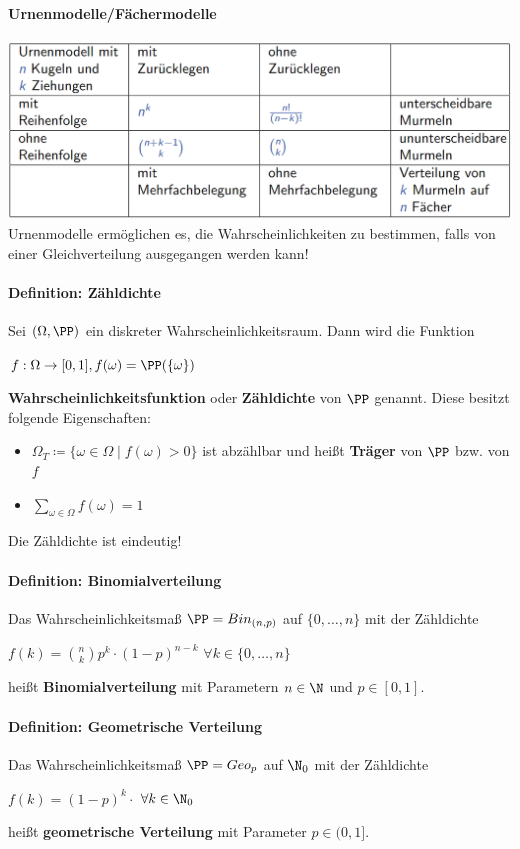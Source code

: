 \paragraph{Urnenmodelle/Fächermodelle}
\includegraphics[width=\textwidth]{images/image1.png}
Urnenmodelle ermöglichen es, die Wahrscheinlichkeiten zu bestimmen, falls von einer Gleichverteilung ausgegangen
werden kann!

\paragraph{Definition: Zähldichte}
Sei $(\Omega,\PP)$ ein diskreter Wahrscheinlichkeitsraum.
Dann wird die Funktion\\
\begin{tightcenter}
	$f:\Omega\rightarrow[0,1], f(\omega)=\PP(\{\omega\})$
\end{tightcenter}
\textbf{Wahrscheinlichkeitsfunktion} oder \textbf{Zähldichte} von $\PP$ genannt.
\newpage
Diese besitzt folgende Eigenschaften:
\begin{itemize}
	\item $\Omega_T\coloneqq\{\omega\in\Omega\mid f(\omega)>0\}$ ist abzählbar und heißt \textbf{Träger} von $\PP$ bzw. von $f$
	\item $\sum\limits_{\omega\in\Omega}f(\omega)=1$
\end{itemize}
Die Zähldichte ist eindeutig!

\paragraph{Definition: Binomialverteilung}
Das Wahrscheinlichkeitsmaß $\PP=Bin_{(n,p)}$ auf $\{0,\ldots,n\}$ mit der Zähldichte\\
\begin{tightcenter}
	$f(k)=\binom{n}{k}p^k\cdot(1-p)^{n-k}$ \qquad$\forall k\in\{0,\ldots,n\}$
\end{tightcenter}
heißt \textbf{Binomialverteilung} mit Parametern $n\in\N$ und $p\in[0,1]$.

\paragraph{Definition: Geometrische Verteilung}
Das Wahrscheinlichkeitsmaß $\PP=Geo_p$ auf $\N_0$ mit der Zähldichte\\
\begin{tightcenter}
	$f(k)=(1-p)^k\cdotp$ \qquad$\forall k\in\N_0$
\end{tightcenter}
heißt \textbf{geometrische Verteilung} mit Parameter $p\in(0,1]$.